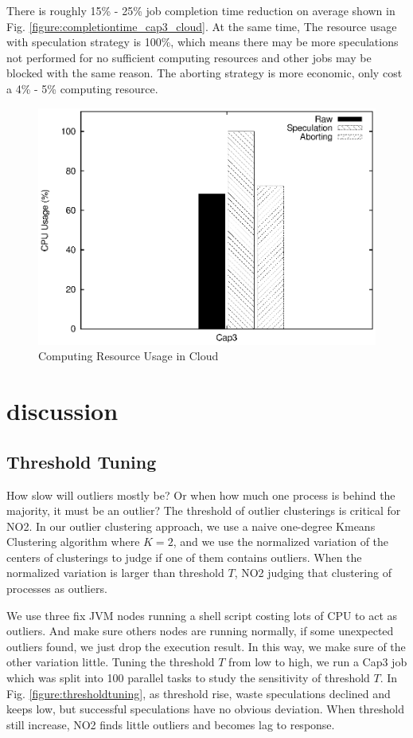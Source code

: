There is roughly 15\% - 25\% job completion time reduction on average shown in Fig. \ref{figure:completiontime_cap3_cloud}. At the same time, The resource usage with speculation strategy is 100\%, which means there may be more speculations not performed for no sufficient computing resources and other jobs may be blocked with the same reason. The aborting strategy is more economic, only cost a 4\% - 5\% computing resource.

\begin{figure}
\centering
\includegraphics[width=0.9\columnwidth]{figures/cloud_resource_usage.eps}
\caption{Computing Resource Usage in Cloud}
\label{figure:resourceusage_cloud}
\end{figure}

\section{discussion}

\subsection{Threshold Tuning}

How slow will outliers mostly be? Or when how much one process is behind the majority, it must be an outlier? The threshold of outlier clusterings is critical for NO2. In our outlier clustering approach, we use a naive one-degree Kmeans Clustering algorithm where $K = 2$, and we use the normalized variation of the centers of clusterings to judge if one of them contains outliers. When the normalized variation is larger than threshold $T$, NO2 judging that clustering of processes as outliers.

We use three fix JVM nodes running a shell script costing lots of CPU to act as outliers. And make sure others nodes are running normally, if some unexpected outliers found, we just drop the execution result. In this way, we make sure of the other variation little. Tuning the threshold $T$ from low to high, we run a Cap3 job which was split into 100 parallel tasks to study the sensitivity of threshold $T$. In Fig. \ref{figure:thresholdtuning}, as threshold rise, waste speculations declined and keeps low, but successful speculations have no obvious deviation. When threshold still increase, NO2 finds little outliers and becomes lag to response.

